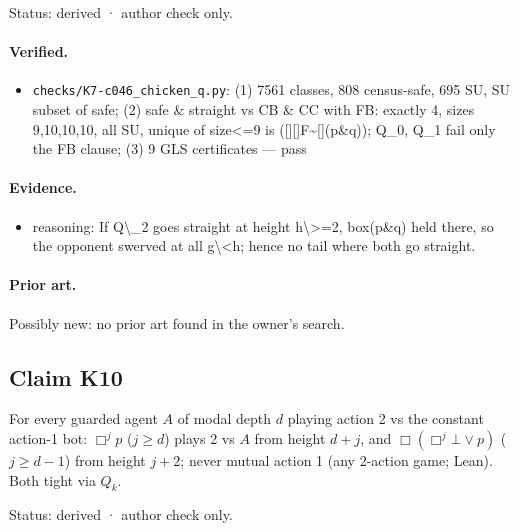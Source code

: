 \documentclass{article}
\begin{document}
Status: derived · author check only.

\paragraph{Verified.}
\begin{itemize}
\item \texttt{checks/K7-c046\_chicken\_q.py}: (1) 7561 classes, 808 census-safe, 695 SU, SU subset of safe; (2) safe \& straight vs CB \& CC with FB: exactly 4, sizes 9,10,10,10, all SU, unique of size\textless{}=9 is ([][]F\textbar{}\textasciitilde{}[](p\&q)); Q\_0, Q\_1 fail only the FB clause; (3) 9 GLS certificates --- pass
\end{itemize}

\paragraph{Evidence.}
\begin{itemize}
\item reasoning: If Q\textbackslash{}\_2 goes straight at height h\textbackslash{}\textgreater{}=2, box(p\&q) held there, so the opponent swerved at all g\textbackslash{}\textless{}h; hence no tail where both go straight.
\end{itemize}

\paragraph{Prior art.} Possibly new: no prior art found in the owner's search.

\subsection*{Claim K10}

For every guarded agent $A$ of modal depth $d$ playing action 2 vs the constant action-1 bot: $\Box^jp$ ($j\ge d$) plays 2 vs $A$ from height $d+j$, and $\Box(\Box^j\bot\vee p)$ ($j\ge d-1$) from height $j+2$; never mutual action 1 (any 2-action game; Lean). Both tight via $Q_k$.

Status: derived · author check only.
\end{document}
